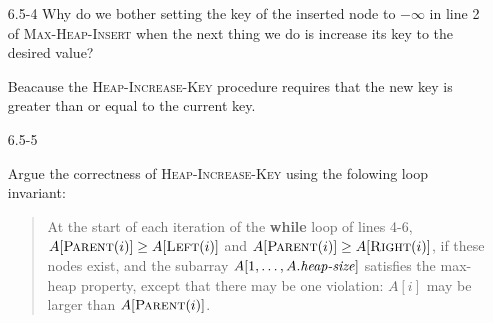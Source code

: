 \begin{enumerate}
\begin{framed}
\begin{algorithm}[H]
\SetAlgoNoEnd\DontPrintSemicolon
\BlankLine
{}
\end{algorithm}

\begin{algorithm}[H]
\SetAlgoNoEnd\DontPrintSemicolon
\BlankLine
{}
\end{algorithm}

\begin{algorithm}[H]
\SetAlgoNoEnd\DontPrintSemicolon
\BlankLine
{}
\end{algorithm}
\end{framed}

\item[6.5{-}4]{Why do we bother setting the key of the inserted node to
$-\infty$ in line 2 of \textsc{Max-Heap-Insert} when the next thing we do is
increase its key to the desired value?}

\begin{framed}
Beacause the \textsc{Heap-Increase-Key} procedure requires that the new key is
greater than or equal to the current key.
\end{framed}

\item[6.5{-}5]{Argue the correctness of \textsc{Heap-Increase-Key} using the
folowing loop invariant:
\begin{quote}
At the start of each iteration of the \textbf{while} loop of lines 4-6,
$A[\textsc{Parent}(i)] \ge A[\textsc{Left}(i)]$ and
$A[\textsc{Parent}(i)] \ge A[\textsc{Right}(i)]$, if these nodes exist, and the
subarray $A[1, \dots, A.\text{\emph{heap-size}}]$ satisfies the max-heap
property, except that there may be one violation: $A[i]$ may be larger than
$A[\textsc{Parent}(i)]$.


\end{quote}}
\end{enumerate}
